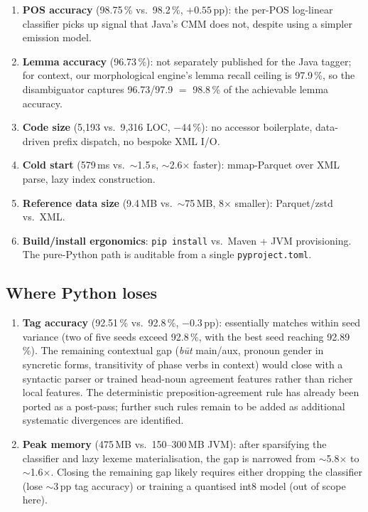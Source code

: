 \documentclass[11pt,a4paper]{article}
\begin{document}
\begin{enumerate}
\item \textbf{POS accuracy} (98.75\,\% vs.\ 98.2\,\%, $+0.55$\,pp): the
  per-POS log-linear classifier picks up signal that Java's CMM does not,
  despite using a simpler emission model.
\item \textbf{Lemma accuracy} (96.73\,\%): not separately published for
  the Java tagger; for context, our morphological engine's lemma recall
  ceiling is 97.9\,\%, so the disambiguator captures 96.73/97.9 $=$ 98.8\,\%
  of the achievable lemma accuracy.
\item \textbf{Code size} (5{,}193 vs.\ 9{,}316 LOC, $-44$\,\%): no
  accessor boilerplate, data-driven prefix dispatch, no bespoke XML I/O.
\item \textbf{Cold start} (579\,ms vs.\ $\sim$1.5\,s, $\sim$2.6$\times$
  faster): mmap-Parquet over XML parse, lazy index construction.
\item \textbf{Reference data size} (9.4\,MB vs.\ $\sim$75\,MB,
  8$\times$ smaller): Parquet/zstd vs.\ XML.
\item \textbf{Build/install ergonomics}: \texttt{pip install} vs.\ Maven +
  JVM provisioning. The pure-Python path is auditable from a single
  \texttt{pyproject.toml}.
\end{enumerate}

\subsection{Where Python loses}

\begin{enumerate}
\item \textbf{Tag accuracy} (92.51\,\% vs.\ 92.8\,\%, $-0.3$\,pp): essentially
  matches within seed variance (two of five seeds exceed 92.8\,\%, with the
  best seed reaching 92.89\,\%). The remaining contextual gap
  (\textit{būt} main/aux, pronoun gender in syncretic forms, transitivity
  of phase verbs in context) would close with a syntactic parser or
  trained head-noun agreement features rather than richer local features.
  The deterministic preposition-agreement rule has already been ported
  as a post-pass; further such rules remain to be added as additional
  systematic divergences are identified.
\item \textbf{Peak memory} (475\,MB vs.\ 150--300\,MB JVM): after sparsifying
  the classifier and lazy lexeme materialisation, the gap is narrowed from
  $\sim$5.8$\times$ to $\sim$1.6$\times$. Closing the remaining gap likely
  requires either dropping the classifier (lose $\sim$3\,pp tag accuracy)
  or training a quantised int8 model (out of scope here).
\end{enumerate}
\end{document}
